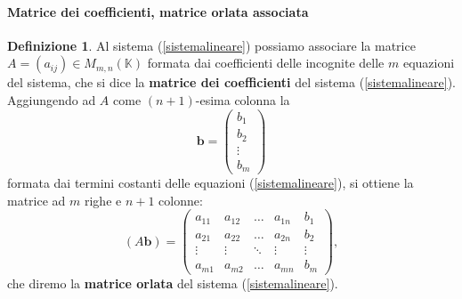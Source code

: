 \documentclass{article}
\theoremstyle{plain}
\theoremstyle{definition}
\newtheorem{defn}{Definizione}[section]
\theoremstyle{remark}
\begin{document}
\paragraph{Matrice dei coefficienti, matrice orlata associata}
\begin{bxthm}
\begin{defn}
    Al sistema (\ref{sistemalineare}) possiamo associare la matrice \( A = (a_{ij}) \in M_{m,n}(\mathbb{K}) \) formata dai coefficienti delle incognite 
    delle \( m \) equazioni del sistema, che si dice la \textbf{matrice dei coefficienti} del sistema (\ref{sistemalineare}). Aggiungendo ad \( A \) come \( (n+1) \)-esima colonna la
\[
    \mathbf{b} =
    \begin{pmatrix}
        b_1 \\
        b_2 \\
        \vdots \\
        b_m
    \end{pmatrix}
\]
formata dai termini costanti delle equazioni (\ref{sistemalineare}), si ottiene la matrice ad \( m \) righe e \( n+1 \) colonne:
\[
(A\mathbf{b}) = \begin{pmatrix}
a_{11} & a_{12} & \ldots & a_{1n} & b_{1} \\
a_{21} & a_{22} & \ldots & a_{2n} & b_{2} \\
\vdots & \vdots & \ddots & \vdots & \vdots \\
a_{m1} & a_{m2} & \ldots & a_{mn} & b_{m}
\end{pmatrix},
\]
che diremo la \textbf{matrice orlata} del sistema (\ref{sistemalineare}).
\end{defn}
\end{bxthm}

\vspace{10pt}
\end{document}
